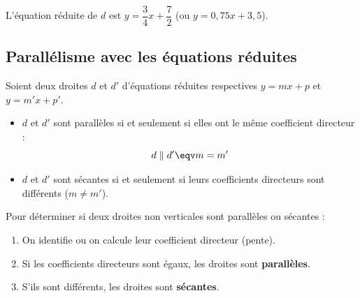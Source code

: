 \begin{meth}
\begin{correction}
		L'équation réduite de $d$ est $y = \dfrac{3}{4}x + \dfrac{7}{2}$ (ou $y = 0{,}75x + 3{,}5$).
	\end{correction}
\end{meth}

\subsection{Parallélisme avec les équations réduites}

\begin{prop}
	Soient deux droites $d$ et $d'$ d'équations réduites respectives $y = mx + p$ et $y = m'x + p'$.
	\begin{itemize}
		\item $d$ et $d'$ sont parallèles si et seulement si elles ont le même coefficient directeur :
		      \[
			      d \parallel d' \eqv m = m'
		      \]
		\item $d$ et $d'$ sont sécantes si et seulement si leurs coefficients directeurs sont différents ($m \neq m'$).
	\end{itemize}
\end{prop}

\begin{methode}
	Pour déterminer si deux droites non verticales sont parallèles ou sécantes :
	\begin{enumerate}
		\item On identifie ou on calcule leur coefficient directeur (pente).
		\item Si les coefficients directeurs sont égaux, les droites sont \textbf{parallèles}.
		\item S'ils sont différents, les droites sont \textbf{sécantes}.
	\end{enumerate}
\end{methode}

